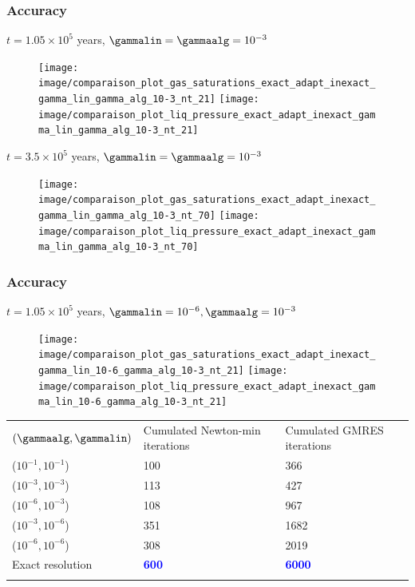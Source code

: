 \documentclass[10 pt]{beamer}
\begin{document}
\begin{frame}
\frametitle{Accuracy}
\vspace{-0.1 cm}
\textcolor{cadmiumgreen}{$t = 1.05 \times 10^5$ years, $\gammalin = \gammaalg = 10^{-3}$} 
\vspace{-0.3 cm}
\begin{figure}
\centering
\texttt{[image: image/comparaison\_plot\_gas\_saturations\_exact\_adapt\_inexact\_gamma\_lin\_gamma\_alg\_10-3\_nt\_21]}
\texttt{[image: image/comparaison\_plot\_liq\_pressure\_exact\_adapt\_inexact\_gamma\_lin\_gamma\_alg\_10-3\_nt\_21]}
\end{figure}
\vspace{-0.2 cm}
\textcolor{cadmiumgreen}{$t = 3.5 \times 10^5$ years, $\gammalin = \gammaalg = 10^{-3}$} 
\vspace{-0.3 cm}
\begin{figure}
\texttt{[image: image/comparaison\_plot\_gas\_saturations\_exact\_adapt\_inexact\_gamma\_lin\_gamma\_alg\_10-3\_nt\_70]}
\texttt{[image: image/comparaison\_plot\_liq\_pressure\_exact\_adapt\_inexact\_gamma\_lin\_gamma\_alg\_10-3\_nt\_70]}
\end{figure}
\end{frame}
%
\begin{frame}
\frametitle{Accuracy}
\textcolor{cadmiumgreen}{$t = 1.05 \times 10^5$ years, $\gammalin = 10^{-6}, \gammaalg = 10^{-3}$} 
\vspace{-0.2 cm}
\begin{figure}
\centering
\texttt{[image: image/comparaison\_plot\_gas\_saturations\_exact\_adapt\_inexact\_gamma\_lin\_10-6\_gamma\_alg\_10-3\_nt\_21]}
\quad
\texttt{[image: image/comparaison\_plot\_liq\_pressure\_exact\_adapt\_inexact\_gamma\_lin\_10-6\_gamma\_alg\_10-3\_nt\_21]}
\end{figure}
\vspace{-0.2 cm}
\scriptsize
\begin{table}
\centering
\begin{tabular}{lll}
\hline\noalign{\smallskip}
  $\left(\gammaalg,\gammalin\right)$ & \parbox{4.4 cm}{Cumulated Newton-min iterations} & \parbox{4.4 cm}{Cumulated GMRES iterations}  \\
\noalign{\smallskip}\hline\noalign{\smallskip}
($10^{-1},10^{-1}$)& 100 & 366 \\
($10^{-3}, 10^{-3}$) & 113  & 427 \\
($10^{-6},10^{-3}$) & 108 & 967 \\
($10^{-3},10^{-6}$) & 351 & 1682 \\
($10^{-6},10^{-6}$) & 308 & 2019 \\ 
Exact resolution & \textcolor{blue}{\textbf{600}} & \textcolor{blue}{\textbf{6000}}\\
\noalign{\smallskip}\hline
\end{tabular}
\end{table}
 
\end{frame}
\end{document}
